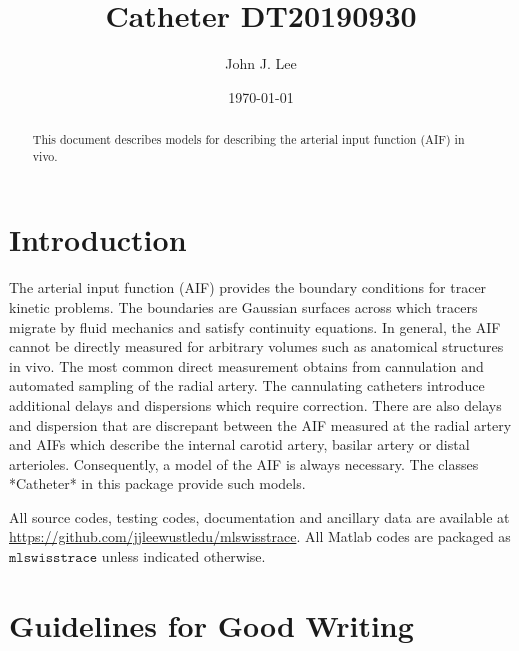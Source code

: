 \title{Catheter DT20190930}
\author         {John J. Lee}
\date{\today}

\begin{abstract}
This document describes models for describing the arterial input function
(AIF) in vivo.  
\end{abstract}

\maketitle

\section{Introduction}

The arterial input function (AIF) provides the boundary conditions 
for tracer kinetic problems.  The boundaries are Gaussian surfaces
across which tracers migrate by fluid mechanics and satisfy continuity
equations.  In general, the AIF cannot be directly measured for arbitrary 
volumes such as anatomical structures in vivo.  The most common direct 
measurement obtains from cannulation and automated sampling of the radial 
artery.  The cannulating catheters introduce additional delays and 
dispersions which require correction.  There are also delays and dispersion
that are discrepant between the AIF measured at the radial artery and AIFs
which describe the internal carotid artery, basilar artery or distal
arterioles.  Consequently, a model of the AIF is always necessary.  The
classes *Catheter* in this package provide such models.  

All source codes, testing codes, documentation and ancillary data are
available at \url{https://github.com/jjleewustledu/mlswisstrace}.  
All Matlab codes are packaged as $\texttt{mlswisstrace}$ unless
indicated otherwise.




\section{Guidelines for Good Writing \cite{pritchard1990}}

